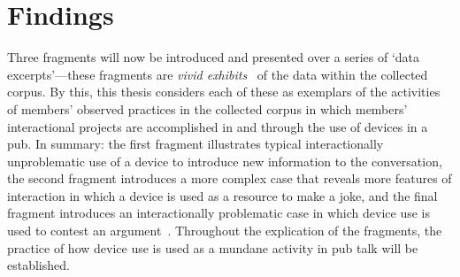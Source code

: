 \section{Findings}\label{sec:empirical pub findings}
\begin{revisedsubmission} %
Three fragments will now be introduced and presented over a series of `data excerpts'---these fragments are \textit{vivid exhibits}~\citep{Crabtree2012} of the data within the collected corpus.
By this, this thesis considers each of these as exemplars of the activities of members' observed practices in the collected corpus in which members' interactional projects are accomplished in and through the use of devices in a pub.
In summary: the first fragment illustrates typical interactionally unproblematic use of a device to introduce new information to the conversation, the second fragment introduces a more complex case that reveals more features of interaction in which a device is used as a resource to make a joke, and the final fragment introduces an interactionally problematic case in which device use is used to contest an argument~\citep[p. 111]{Heath2010}.
Throughout the explication of the fragments, the practice of how device use is used as a mundane activity in pub talk will be established.






\end{revisedsubmission}
